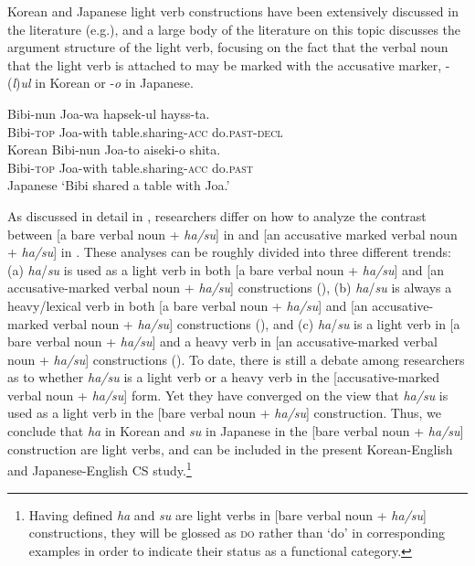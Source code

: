 Korean and Japanese light verb constructions have been extensively discussed in the literature (e.g.\citealt{Ahn1991,Bak2011,Chae1996,ChoiWeschler2001,Dubinsky1994,GrimshawMester1988,Jun2003,Kim1991,ParkK1992,SaitoHoshi2000,ShimadaKordoni2003}), and a large body of the literature on this topic discusses the argument structure of the light verb, focusing on the fact that the verbal noun that the light verb is attached to may be marked with the accusative marker, -(\textit{l})\textit{ul} in Korean or -\textit{o} in Japanese.

\begin{exe}\ex\label{ex:31}
\begin{xlist}
    \ex \gll Bibi-nun Joa-wa 	hapsek-ul	     hayss-ta.	\\
   	Bibi-\textsc{top} Joa-with	table.sharing-\textsc{acc} do.\textsc{past}-\textsc{decl} \\
      \hfill Korean
    \ex \gll Bibi-nun Joa-to 	aiseki-o	     shita.	\\
    	Bibi-\textsc{top} Joa-with	table.sharing-\textsc{acc} do.\textsc{past} \\
      \hfill Japanese
    \glt ‘Bibi shared a table with Joa.’	\\
\end{xlist}
\end{exe}

As discussed in detail in \citet{Shim2013}, researchers differ on how to analyze the contrast between [a bare verbal noun + \textit{ha/su}] in  and [an accusative marked verbal noun + \textit{ha/su}] in . These analyses can be roughly divided into three different trends: (a) \textit{ha}/\textit{su} is used as a light verb in both [a bare verbal noun + \textit{ha/su}] and [an accusative-marked verbal noun + \textit{ha/su}] constructions (\citealt{Jung2003,ParkK1992,ParkK1995,GrimshawMester1988}), (b) \textit{ha}/\textit{su} is always a heavy/lexical verb in both [a bare verbal noun + \textit{ha/su}] and [an accusative-marked verbal noun + \textit{ha/su}] constructions (\citealt{Terada1990}), and (c) \textit{ha}/\textit{su} is a light verb in [a bare verbal noun + \textit{ha/su}] and a heavy verb in [an accusative-marked verbal noun + \textit{ha/su}] constructions (\citealt{Ahn1991,Miyamoto1999,UchidaNakayama1993}). To date, there is still a debate among researchers as to whether \textit{ha/su} is a light verb or a heavy verb in the [accusative-marked verbal noun + \textit{ha/su}] form. Yet they have converged on the view that \textit{ha/su} is used as a light verb in the [bare verbal noun + \textit{ha/su}] construction. Thus, we conclude that \textit{ha} in Korean and \textit{su} in Japanese in the [bare verbal noun + \textit{ha/su}] construction are light verbs, and can be included in the present Korean-English and Japanese-English \ac{CS} study.\footnote{\textrm{Having defined} \textrm{\textit{ha}} \textrm{and} \textrm{\textit{su}} \textrm{are light verbs in [bare verbal noun +} \textrm{\textit{ha/su}}\textrm{] constructions, they will be glossed as} \textrm{\textsc{do}} \textrm{rather than ‘do’ in corresponding examples in order to indicate their status as a functional category.} } 

